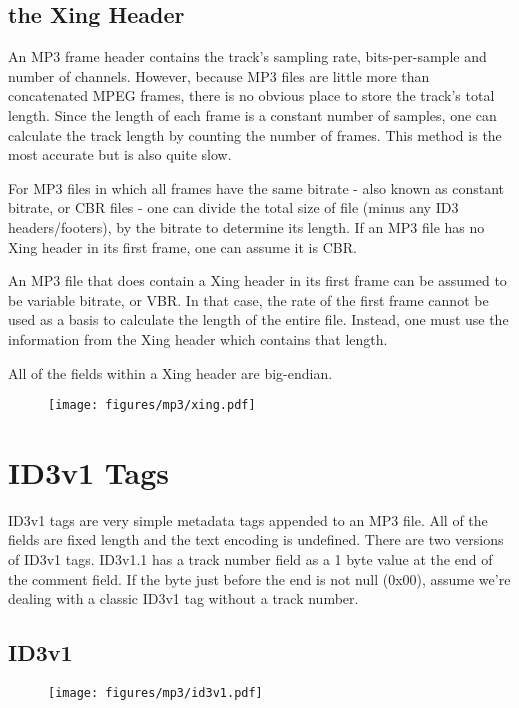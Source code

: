 \clearpage

\subsection{the Xing Header}

An MP3 frame header contains the track's sampling rate,
bits-per-sample and number of channels.
However, because MP3 files are little more than
concatenated MPEG frames, there is no obvious place to
store the track's total length.
Since the length of each frame is a constant number of samples,
one can calculate the track length by counting the number of frames.
This method is the most accurate but is also quite slow.

For MP3 files in which all frames have the same bitrate
- also known as constant bitrate, or CBR files -
one can divide the total size of file (minus any ID3 headers/footers),
by the bitrate to determine its length.
If an MP3 file has no Xing header in its first frame,
one can assume it is CBR.

An MP3 file that does contain a Xing header in its first frame
can be assumed to be variable bitrate, or VBR.
In that case, the rate of the first frame cannot be used as a
basis to calculate the length of the entire file.
Instead, one must use the information from the Xing header
which contains that length.

All of the fields within a Xing header are big-endian.
\begin{figure}[h]
\texttt{[image: figures/mp3/xing.pdf]}
\end{figure}

\clearpage

\section{ID3v1 Tags}
ID3v1 tags are very simple metadata tags appended to an MP3 file.
All of the fields are fixed length and the text encoding is
undefined.
There are two versions of ID3v1 tags.
ID3v1.1 has a track number field as a 1 byte value
at the end of the comment field.
If the byte just before the end is not null (0x00),
assume we're dealing with a classic ID3v1 tag without a
track number.

\subsection{ID3v1}

\begin{figure}[h]
\texttt{[image: figures/mp3/id3v1.pdf]}
\end{figure}

